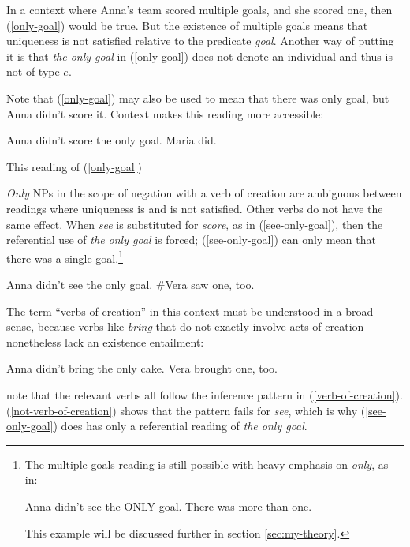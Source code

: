 In a context where Anna's team scored multiple goals, and she scored one, then (\ref{only-goal}) would be true. But the existence of multiple goals means that uniqueness is not satisfied relative to the predicate \textit{goal}. Another way of putting it is that \textit{the only goal} in (\ref{only-goal}) does not denote an individual and thus is not of type $e$.

Note that (\ref{only-goal}) may also be used to mean that there was only goal, but Anna didn't score it. Context makes this reading more accessible:

\begin{exe}
	\ex Anna didn't score the only goal. Maria did.
\end{exe}

This reading of (\ref{only-goal})

\textit{Only} NPs in the scope of negation with a verb of creation are ambiguous between readings where uniqueness is and is not satisfied. Other verbs do not have the same effect. When \textit{see} is substituted for \textit{score}, as in (\ref{see-only-goal}), then the referential use of \textit{the only goal} is forced; (\ref{see-only-goal}) can only mean that there was a single goal.\footnote{The multiple-goals reading is still possible with heavy emphasis on \textit{only}, as in: \begin{exe} \ex Anna didn't see the ONLY goal. There was more than one. \end{exe} This example will be discussed further in section \ref{sec:my-theory}.}

\begin{exe}
	\ex \label{see-only-goal} Anna didn't see the only goal. \#Vera saw one, too.
\end{exe}

The term ``verbs of creation'' in this context must be understood in a broad sense, because verbs like \textit{bring} that do not exactly involve acts of creation nonetheless lack an existence entailment:

\begin{exe}
	\ex Anna didn't bring the only cake. Vera brought one, too.
\end{exe}

\citet{cb2015} note that the relevant verbs all follow the inference pattern in (\ref{verb-of-creation}). (\ref{not-verb-of-creation}) shows that the pattern fails for \textit{see}, which is why (\ref{see-only-goal}) does has only a referential reading of \textit{the only goal}.

